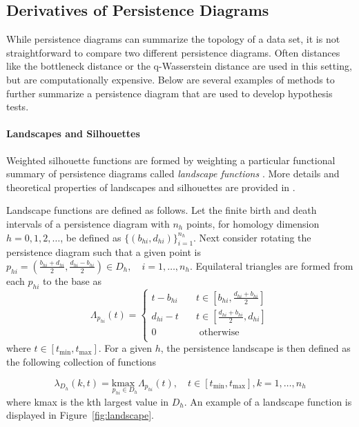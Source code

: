 \documentclass[12pt]{article}
\begin{document}
\subsection{Derivatives of Persistence Diagrams}
While persistence diagrams can summarize the topology of a data set, it is not straightforward to compare two different persistence diagrams. Often distances like the bottleneck distance or the q-Wasserstein distance are used in this setting, but are computationally expensive. Below are several examples of methods to further summarize a persistence diagram that are used to develop hypothesis tests.

\paragraph{Landscapes and Silhouettes}
Weighted silhouette functions are formed by weighting a particular functional summary of persistence diagrams called \emph{landscape functions} \citep{bubenik2015statistical}. More details and theoretical properties of landscapes and silhouettes are provided in \citep{chazal2014stochastic}.

Landscape functions are defined as follows.  Let the finite birth and death intervals of a persistence diagram with $n_h$ points, for homology dimension $h = 0, 1, 2, \ldots$, be defined as $\{(b_{hi},d_{hi})\}_{i = 1}^{n_h}$.  Next consider rotating the persistence diagram such that a given point is $p_{hi} = \left(\frac{b_{hi}+d_{hi}}{2}, \frac{d_{hi}-b_{hi}}{2}\right) \in D_h, \quad i = 1, \ldots, n_h$.  Equilateral triangles are formed from each $p_{hi}$ to the base as
\begin{equation*}
\Lambda_{p_{hi}}(t) =
  \begin{cases}
    t - b_{hi}  & \quad t \in [b_{hi}, \frac{d_{hi}+b_{hi}}{2}]\\
    d_{hi} - t  & \quad t \in [\frac{d_{hi}+b_{hi}}{2}, d_{hi}]\\
    0  & \quad \text{ otherwise}\\
  \end{cases}
\end{equation*}
where $t \in [t_{\min}, t_{\max}]$. For a given $h$, the persistence landscape is then defined as the following collection of functions

\begin{equation*}
\lambda_{D_h}(k, t) = \underset{p_{hi}\in D_h}{\text{kmax }} \Lambda_{p_{hi}}(t), \quad t \in [t_{\min}, t_{\max}], k = 1, \ldots, n_h
\end{equation*}
where kmax is the kth largest value in $D_h$.  An example of a landscape function is displayed in Figure~\ref{fig:landscape}.
\end{document}
